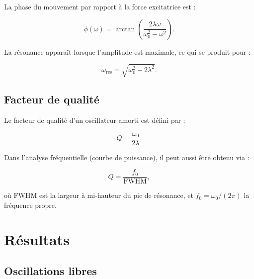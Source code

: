 La phase du mouvement par rapport à la force excitatrice est :

\begin{equation}
\phi(\omega)
= \arctan\!\left(\frac{2\lambda\omega}{\omega_0^2 - \omega^2}\right).
\label{eq:phase_forcee}
\end{equation}

La résonance apparaît lorsque l’amplitude est maximale, ce qui se produit pour :

\begin{equation}
\omega_{\mathrm{res}} = \sqrt{\omega_0^2 - 2\lambda^2}.
\label{eq:omega_res}
\end{equation}


\subsection{Facteur de qualité} \label{subsec:facteur_Q}

Le facteur de qualité d’un oscillateur amorti est défini par :

\begin{equation}
Q = \frac{\omega_0}{2\lambda}.
\label{eq:Q_lambda}
\end{equation}

Dans l’analyse fréquentielle (courbe de puissance), il peut aussi être obtenu via :

\begin{equation}
Q = \frac{f_0}{\mathrm{FWHM}},
\label{eq:Q_fwhm}
\end{equation}

où $\mathrm{FWHM}$ est la largeur à mi-hauteur du pic de résonance,
et $f_0 = \omega_0 / (2\pi)$ la fréquence propre.

\section{Résultats}

\subsection{Oscillations libres}

